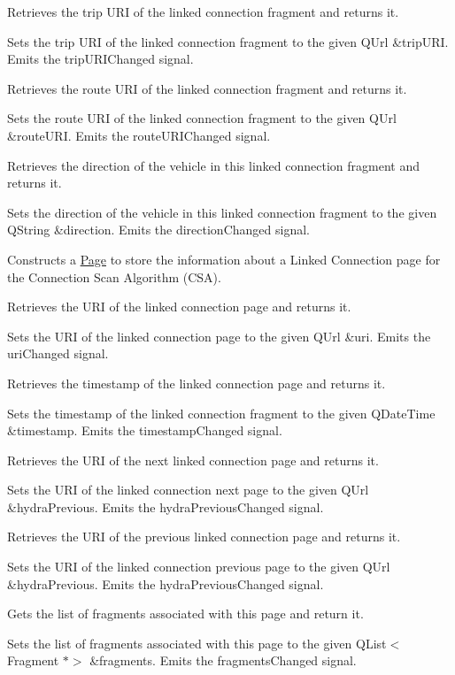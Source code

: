 Retrieves the trip U\+RI of the linked connection fragment and returns it.

Sets the trip U\+RI of the linked connection fragment to the given Q\+Url \&trip\+U\+RI. Emits the trip\+U\+R\+I\+Changed signal.

Retrieves the route U\+RI of the linked connection fragment and returns it.

Sets the route U\+RI of the linked connection fragment to the given Q\+Url \&route\+U\+RI. Emits the route\+U\+R\+I\+Changed signal.

Retrieves the direction of the vehicle in this linked connection fragment and returns it.

Sets the direction of the vehicle in this linked connection fragment to the given Q\+String \&direction. Emits the direction\+Changed signal.

Constructs a \mbox{\hyperlink{classFragments_1_1Page}{Page}} to store the information about a Linked Connection page for the Connection Scan Algorithm (C\+SA).

Retrieves the U\+RI of the linked connection page and returns it.

Sets the U\+RI of the linked connection page to the given Q\+Url \&uri. Emits the uri\+Changed signal.

Retrieves the timestamp of the linked connection page and returns it.

Sets the timestamp of the linked connection fragment to the given Q\+Date\+Time \&timestamp. Emits the timestamp\+Changed signal.

Retrieves the U\+RI of the next linked connection page and returns it.

Sets the U\+RI of the linked connection next page to the given Q\+Url \&hydra\+Previous. Emits the hydra\+Previous\+Changed signal.

Retrieves the U\+RI of the previous linked connection page and returns it.

Sets the U\+RI of the linked connection previous page to the given Q\+Url \&hydra\+Previous. Emits the hydra\+Previous\+Changed signal.

Gets the list of fragments associated with this page and return it.

Sets the list of fragments associated with this page to the given Q\+List$<$\+Fragment $\ast$$>$ \&fragments. Emits the fragments\+Changed signal. 